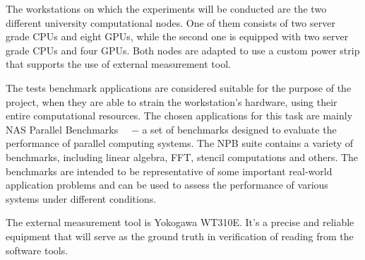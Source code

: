 The workstations on which the experiments will be conducted are
the two different university computational nodes. One of them
consists of two server grade CPUs and eight GPUs, while the second
one is equipped with two server grade CPUs and four GPUs. Both nodes
are adapted to use a custom power strip that supports the use
of external measurement tool.

The tests benchmark applications are considered suitable for the
purpose of the project, when they are able to strain the
workstation's hardware, using their entire computational resources.
The chosen applications for this task are mainly NAS Parallel
Benchmarks~\cite{NPB}~\cite{NASA_Advanced_Supercomputing} $-$ a set
of benchmarks designed to evaluate the performance of parallel
computing systems. The NPB suite contains a variety of
benchmarks, including linear algebra, FFT, stencil computations
and others. The benchmarks are intended to be representative of
some important real-world application problems and can be used
to assess the performance of various systems under different
conditions.

The external measurement tool is Yokogawa WT310E. It's a precise
and reliable equipment that will serve as the ground truth in
verification of reading from the software tools.
